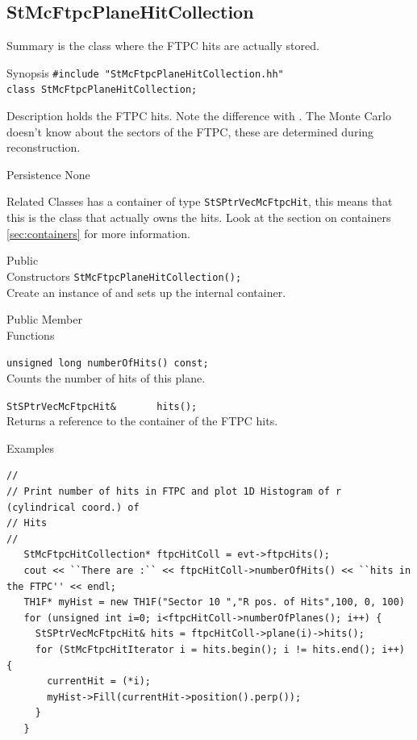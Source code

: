 \subsection{StMcFtpcPlaneHitCollection}
 
\label{sec:StMcFtpcPlaneHitCollection}
\begin{Entry}
\item[Summary]
     is the class where the FTPC hits
    are actually stored.

\item[Synopsis]
    \verb+#include "StMcFtpcPlaneHitCollection.hh"+\\
    \verb+class StMcFtpcPlaneHitCollection;+\\

\item[Description]
     holds the FTPC hits.  Note
    the difference with \StEvent.  The Monte Carlo doesn't know
    about the sectors of the FTPC, these are determined during
    reconstruction.

\item[Persistence]
    None

\item[Related Classes]
    has a container of type {\tt StSPtrVecMcFtpcHit}, this means
    that this is the class that actually owns the hits.  Look
    at the section on containers \ref{sec:containers} for more
    information.    
\item[Public\\ Constructors]
    \verb+StMcFtpcPlaneHitCollection();+\\
    Create an instance of 
    and sets up the internal container.

\item[Public Member\\ Functions]

    \verb+unsigned long numberOfHits() const;+\\
    Counts the number of hits of this plane.

    \verb+StSPtrVecMcFtpcHit&       hits();+\\
    Returns a reference to the container of the FTPC hits.
    
\item[Examples]
{\footnotesize
\begin{verbatim}
//
// Print number of hits in FTPC and plot 1D Histogram of r (cylindrical coord.) of
// Hits
//  
   StMcFtpcHitCollection* ftpcHitColl = evt->ftpcHits();
   cout << ``There are :`` << ftpcHitColl->numberOfHits() << ``hits in the FTPC'' << endl; 
   TH1F* myHist = new TH1F("Sector 10 ","R pos. of Hits",100, 0, 100)
   for (unsigned int i=0; i<ftpcHitColl->numberOfPlanes(); i++) {
     StSPtrVecMcFtpcHit& hits = ftpcHitColl->plane(i)->hits();
     for (StMcFtpcHitIterator i = hits.begin(); i != hits.end(); i++) {
       currentHit = (*i);
       myHist->Fill(currentHit->position().perp());
     }
   }
\end{verbatim}
}%
\end{Entry}


